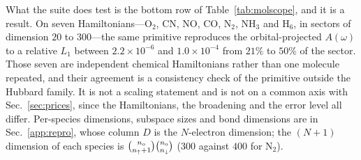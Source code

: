 What the suite does test is the bottom row of Table~\ref{tab:molscope}, and it is a result. On seven
Hamiltonians---$\mathrm{O_2}$, CN, NO, CO, $\mathrm{N_2}$, $\mathrm{NH_3}$ and $\mathrm{H_6}$, in
sectors of dimension $20$ to $300$---the same primitive reproduces the orbital-projected $A(\omega)$ to
a relative $L_1$ between $2.2\times10^{-6}$ and $1.0\times10^{-4}$ from $21\%$ to $50\%$ of the sector.
Those seven are independent chemical Hamiltonians rather than one molecule repeated, and their
agreement is a consistency check of the primitive outside the Hubbard family. It is not a scaling
statement and is not on a common axis with Sec.~\ref{sec:prices}, since the Hamiltonians, the
broadening and the error level all differ. Per-species dimensions, subspace sizes and bond dimensions
are in Sec.~\ref{app:repro}, whose column $D$ is the $N$-electron dimension; the $(N{+}1)$ dimension of each species is $\binom{n_{\rm o}}{n_\uparrow+1}\binom{n_{\rm o}}{n_\downarrow}$ ($300$ against $400$ for $\mathrm{N_2}$).
